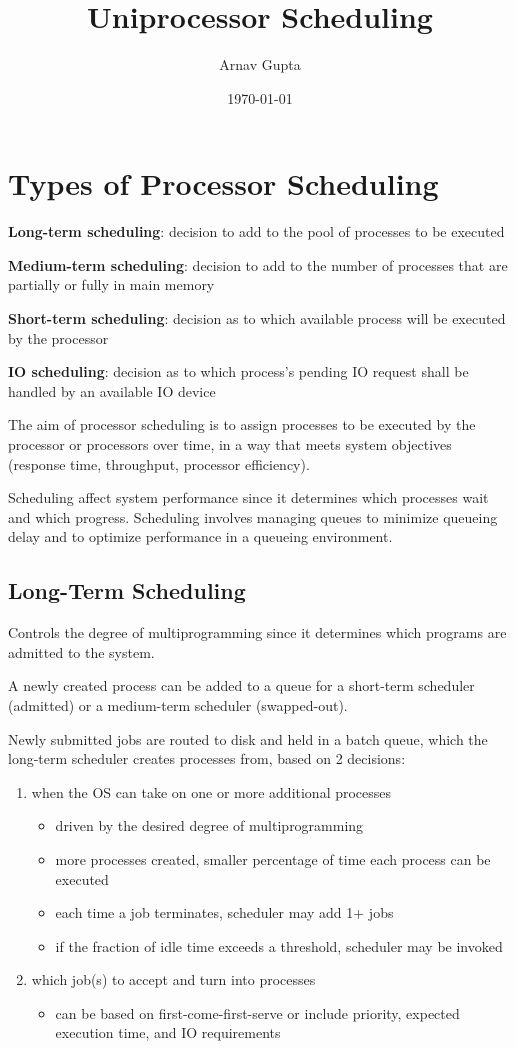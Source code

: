 \documentclass[11pt]{article}
\author{Arnav Gupta}
\date{\today}
\title{Uniprocessor Scheduling}
\begin{document}
\maketitle
\tableofcontents

\section{Types of Processor Scheduling}
\label{sec:org1e4b5b0}
\textbf{Long-term scheduling}: decision to add to the pool of processes to be executed

\textbf{Medium-term scheduling}: decision to add to the number of processes that are partially or
fully in main memory

\textbf{Short-term scheduling}: decision as to which available process will be executed by the
processor

\textbf{IO scheduling}: decision as to which process's pending IO request shall be handled by an
available IO device

The aim of processor scheduling is to assign processes to be executed by the processor or
processors over time, in a way that meets system objectives (response time, throughput,
processor efficiency).

Scheduling affect system performance since it determines which processes wait and which
progress.
Scheduling involves managing queues to minimize queueing delay and to optimize performance
in a queueing environment.
\subsection{Long-Term Scheduling}
\label{sec:org8b7eb74}
Controls the degree of multiprogramming since it determines which programs are admitted
to the system.

A newly created process can be added to a queue for a short-term scheduler (admitted)
or a medium-term scheduler (swapped-out).

Newly submitted jobs are routed to disk and held in a batch queue, which the long-term
scheduler creates processes from, based on 2 decisions:
\begin{enumerate}
\item when the OS can take on one or more additional processes
\begin{itemize}
\item driven by the desired degree of multiprogramming
\item more processes created, smaller percentage of time each process can be executed
\item each time a job terminates, scheduler may add 1+ jobs
\item if the fraction of idle time exceeds a threshold, scheduler may be invoked
\end{itemize}
\item which job(s) to accept and turn into processes
\begin{itemize}
\item can be based on first-come-first-serve or include priority, expected execution time,
and IO requirements
\end{itemize}
\end{enumerate}
\end{document}
